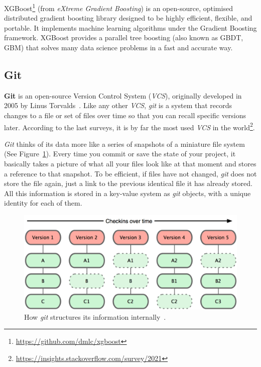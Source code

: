 \documentclass[a4paper, 12pt]{book}
\begin{document}
XGBoost\footnote{\url{https://github.com/dmlc/xgboost}} (from \textit{eXtreme Gradient Boosting}) is an open-source, optimised distributed gradient boosting library designed to be highly efficient, flexible, and portable. It implements machine learning algorithms under the Gradient Boosting framework. XGBoost provides a parallel tree boosting (also known as GBDT, GBM) that solves many data science problems in a fast and accurate way.


\subsection{Git}
\label{ssec:git}

\textbf{Git} is an open-source Version Control System (\emph{VCS}), originally developed in 2005 by Linus Torvalds~\cite{somasundaram2013git}.
Like any other \emph{VCS}, \emph{git} is a system that records changes to a file or set of files over time
so that you can recall specific versions later. According to the last surveys, it is by far the most used \emph{VCS} in the
world\footnote{\url{https://insights.stackoverflow.com/survey/2021}}.

\emph{Git} thinks of its data more like a series of snapshots of a miniature file system (See Figure~\ref{fig:info-git}).
Every time you commit or save the state of your project, it basically takes a picture of what all
your files look like at that moment and stores a reference to that snapshot. To be efficient, if files have not changed,
\emph{git} does not store the file again, just a link to the previous identical file it has already stored.
All this information is stored in a key-value system as \emph{git} objects, with a unique identity for each of them.

\begin{figure}
  \centering
  \includegraphics[width=12cm, keepaspectratio]{img/snapshots-git}
  \caption{How \emph{git} structures its information internally~\cite{progit2014book}.}
  \label{fig:info-git}
\end{figure}
\end{document}
